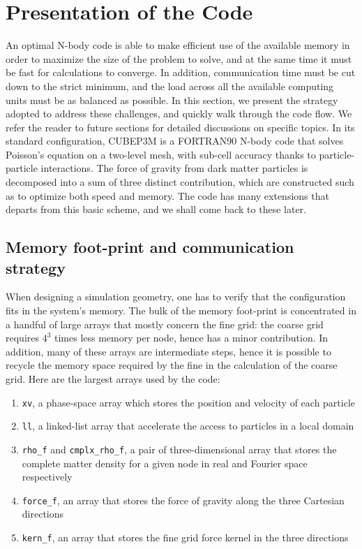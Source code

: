 \section{Presentation of the Code}
\label{sec:presentation}



An optimal N-body code is able to make efficient use of the available memory in order to maximize the size of the problem to solve,
and at the same time it must be fast for calculations to converge. In addition, communication time must be cut down to the strict minimum, 
and the load across all the available computing units must be as balanced as possible. 
In this section, we present the strategy adopted to address these challenges, and quickly walk through the code flow.
We refer the reader to future sections for detailed discussions on specific topics.
In its standard configuration, {\small CUBEP3M} is a {\small FORTRAN90} N-body code that solves Poisson's equation on a two-level mesh, 
with sub-cell accuracy thanks to particle-particle interactions. The force of gravity from dark matter particles is decomposed into a sum of three distinct contribution,
which are constructed such as to optimize both speed and memory. The code has many extensions that departs from this basic scheme, and
we shall come back to these later. 

\subsection{Memory foot-print and communication strategy}
\label{subsec:memory}
When designing a simulation geometry, one has to verify that the configuration fits in the system's memory.
The bulk of the memory foot-print is concentrated in a handful of large arrays that mostly concern the fine grid:
the coarse grid requires $4^3$ times less memory per node, hence has a minor contribution. 
In addition, many of these arrays are intermediate steps, hence it is possible to recycle the memory space required by the fine 
in the calculation of the coarse grid.  
Here are the largest  arrays used by the code:
\begin{enumerate}
\item{{\tt xv}, a phase-space array which stores the position and velocity of each particle} 
\item{{\tt ll}, a linked-list array that accelerate the access to particles in a local domain}
\item{{\tt rho\_f} and {\tt cmplx\_rho\_f}, a pair of three-dimensional array that stores 
the complete matter density for a given node in real and Fourier space respectively}
\item{{\tt force\_f}, an array that stores the force of gravity along the three Cartesian directions}
\item{{\tt kern\_f}, an array that stores the fine grid force kernel in the three directions}
\end{enumerate}

